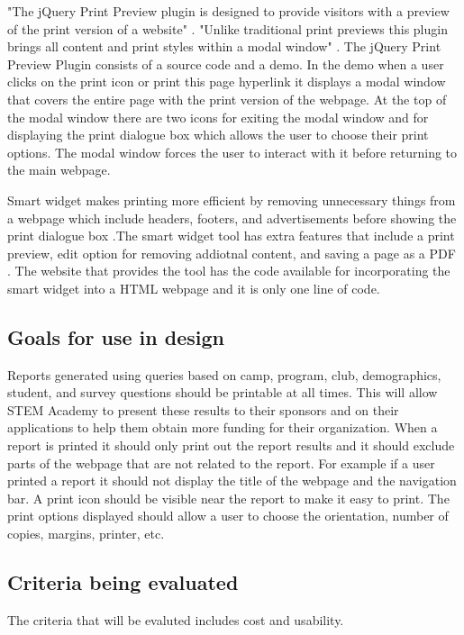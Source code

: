 \documentclass[12pt, draftclsnofoot, onecolumn]{IEEEtran}
\begin{document}
"The jQuery Print Preview plugin is designed to provide visitors with a preview of the print version of a website" \cite{Sam}. "Unlike traditional print previews this plugin brings all content and print styles within a modal window" \cite{Sam}. The jQuery Print Preview Plugin consists of a source code and a demo. In the demo when a user clicks on the print icon or print this page hyperlink it displays a modal window that covers the entire page with the print version of the webpage. At the top of the modal window there are two icons for exiting the modal window and for displaying the print dialogue box which allows the user to choose their print options. The modal window forces the user to interact with it before returning to the main webpage.

Smart widget makes printing more efficient by removing unnecessary things from a webpage which include headers, footers, and advertisements before showing the print dialogue box \cite{SmartW}.The smart widget tool has extra features that include a print preview, edit option for removing addiotnal content, and saving a page as a PDF \cite{SmartW}. The website that provides the tool has the code available for incorporating the smart widget into a HTML webpage and it is only one line of code. 

\subsection{Goals for use in design}
Reports generated using queries based on camp, program, club, demographics, student, and survey questions should be printable at all times. This will allow STEM Academy to present these results to their sponsors and on their applications to help them obtain more funding for their organization. When a report is printed it should only print out the report results and it should exclude parts of the webpage that are not related to the report. For example if a user printed a report it should not display the title of the webpage and the navigation bar. A print icon should be visible near the report to make it easy to print. The print options displayed should allow a user to choose the orientation, number of copies, margins, printer, etc. 


\subsection{Criteria being evaluated}
The criteria that will be evaluted includes cost and usability. 
\end{document}
